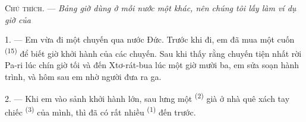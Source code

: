 %
%
%
%
%

\VUsaut{4.0mm}
\VUsaut{2.4mm}
\VUsaut{3.4mm}
\textsc{Chú thích.} --- \textit{Bảng giờ dùng ở mỗi nước một khác, nên chúng tôi lấy làm
ví dụ giờ của} 

1. --- Em vừa đi một chuyến qua nước Đức. Trước khi đi, em đã mua một cuốn  \textsuperscript{(15)} để biết giờ khởi hành của các chuyến. Sau khi thấy rằng
chuyến tiện nhất rời Pa-ri lúc chín giờ tối và đến Xtơ-rát-bua lúc một giờ mười ba, em
sửa soạn hành trình, và hôm sau em nhờ người đưa ra ga.

2. --- Khi em vào sảnh khởi hành lớn, sau lưng một 
\textsuperscript{(2)} già ở nhà quê xách tay chiếc 
\textsuperscript{(3)} của mình, thì đã có rất nhiều 
\textsuperscript{(1)} đến trước.

